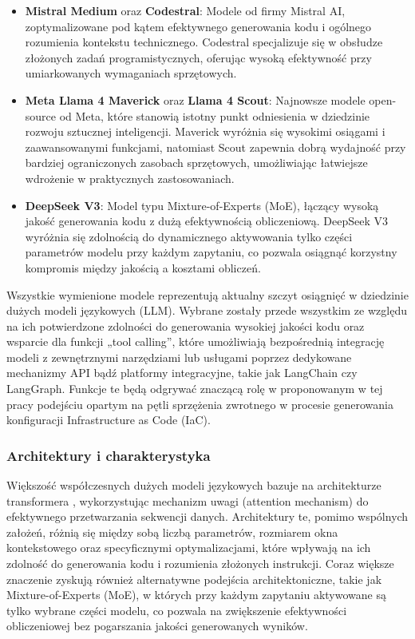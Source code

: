 \begin{itemize}
    \item \textbf{Mistral Medium} oraz \textbf{Codestral}: Modele od firmy Mistral AI, zoptymalizowane pod kątem efektywnego generowania kodu i ogólnego rozumienia kontekstu technicznego. Codestral specjalizuje się w obsłudze złożonych zadań programistycznych, oferując wysoką efektywność przy umiarkowanych wymaganiach sprzętowych.
    \item \textbf{Meta Llama 4 Maverick} oraz \textbf{Llama 4 Scout}: Najnowsze modele open-source od Meta, które stanowią istotny punkt odniesienia w dziedzinie rozwoju sztucznej inteligencji. Maverick wyróżnia się wysokimi osiągami i zaawansowanymi funkcjami, natomiast Scout zapewnia dobrą wydajność przy bardziej ograniczonych zasobach sprzętowych, umożliwiając łatwiejsze wdrożenie w praktycznych zastosowaniach.
    \item \textbf{DeepSeek V3}: Model typu Mixture-of-Experts (MoE), łączący wysoką jakość generowania kodu z dużą efektywnością obliczeniową. DeepSeek V3 wyróżnia się zdolnością do dynamicznego aktywowania tylko części parametrów modelu przy każdym zapytaniu, co pozwala osiągnąć korzystny kompromis między jakością a kosztami obliczeń.
\end{itemize}

Wszystkie wymienione modele reprezentują aktualny szczyt osiągnięć w dziedzinie dużych modeli językowych (LLM). Wybrane zostały przede wszystkim ze względu na ich potwierdzone zdolności do generowania wysokiej jakości kodu oraz wsparcie dla funkcji „tool calling”, które umożliwiają bezpośrednią integrację modeli z zewnętrznymi narzędziami lub usługami poprzez dedykowane mechanizmy API bądź platformy integracyjne, takie jak LangChain czy LangGraph. Funkcje te będą odgrywać znaczącą rolę w proponowanym w tej pracy podejściu opartym na pętli sprzężenia zwrotnego w procesie generowania konfiguracji Infrastructure as Code (IaC).

\subsubsection{Architektury i charakterystyka}

Większość współczesnych dużych modeli językowych bazuje na architekturze transformera \cite{vaswani_attention_2023}, wykorzystując mechanizm uwagi (attention mechanism) do efektywnego przetwarzania sekwencji danych. Architektury te, pomimo wspólnych założeń, różnią się między sobą liczbą parametrów, rozmiarem okna kontekstowego oraz specyficznymi optymalizacjami, które wpływają na ich zdolność do generowania kodu i rozumienia złożonych instrukcji. Coraz większe znaczenie zyskują również alternatywne podejścia architektoniczne, takie jak Mixture-of-Experts (MoE), w których przy każdym zapytaniu aktywowane są tylko wybrane części modelu, co pozwala na zwiększenie efektywności obliczeniowej bez pogarszania jakości generowanych wyników.

